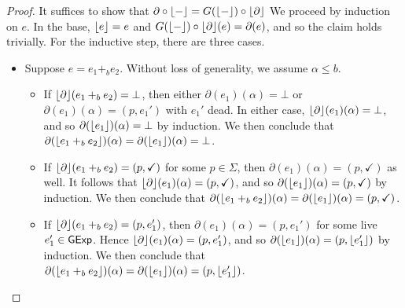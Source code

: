 \documentclass[orivec,envcountsect,envcountsame]{llncs}
\begin{document}
\restateprunecommutes*
\begin{proof}
	It suffices to show that \(\partial \circ \lfloor-\rfloor = G(\lfloor-\rfloor) \circ \lfloor\partial\rfloor\)
	We proceed by induction on $e$.
	In the base, $\lfloor e\rfloor = e$ and $G(\lfloor-\rfloor) \circ \lfloor\partial\rfloor(e) = \partial(e)$, and so the claim holds trivially.
	For the inductive step, there are three cases.
	\begin{itemize}
		\item
		Suppose $e = e_1 +_b e_2$.
		Without loss of generality, we assume $\alpha \leq b$.
		\begin{itemize}
			\item
			If $\lfloor\partial\rfloor(e_1 +_b e_2) = \bot$, then either $\partial(e_1)(\alpha) = \bot$ or $\partial(e_1)(\alpha) = (p, e_1')$ with $e_1'$ dead.
			In either case, $\lfloor\partial\rfloor(e_1)(\alpha) = \bot$, and so $\partial(\lfloor e_1\rfloor)(\alpha) = \bot$ by induction.
			We then conclude that $\partial(\lfloor e_1 +_b e_2\rfloor)(\alpha) = \partial(\lfloor e_1\rfloor)(\alpha) = \bot$.

			\item
			If $\lfloor\partial\rfloor(e_1 +_b e_2) = (p, \checkmark)$ for some $p \in \Sigma$, then $\partial(e_1)(\alpha) = (p, \checkmark)$ as well.
			It follows that $\lfloor\partial\rfloor(e_1)(\alpha) = (p, \checkmark)$, and so $\partial(\lfloor e_1\rfloor)(\alpha) = (p, \checkmark)$ by induction.
			We then conclude that $\partial(\lfloor e_1 +_b e_2\rfloor)(\alpha) = \partial(\lfloor e_1\rfloor)(\alpha) = (p, \checkmark)$.

			\item
			If $\lfloor\partial\rfloor(e_1 +_b e_2) = (p, e_1')$, then $\partial(e_1)(\alpha) = (p, e_1')$ for some live $e_1' \in \mathsf{GExp}$.
			Hence $\lfloor\partial\rfloor(e_1)(\alpha) = (p, e_1')$, and so $\partial(\lfloor e_1\rfloor)(\alpha) = (p, \lfloor e_1'\rfloor)$ by induction.
			We then conclude that $\partial(\lfloor e_1 +_b e_2\rfloor)(\alpha) = \partial(\lfloor e_1\rfloor)(\alpha) = (p, \lfloor e_1'\rfloor)$.
		\end{itemize}


\end{itemize}
\end{proof}
\end{document}
